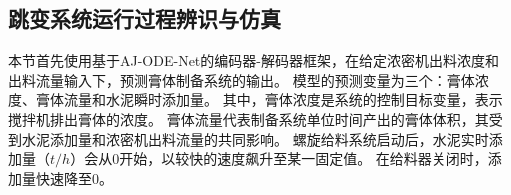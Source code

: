 \subsection{跳变系统运行过程辨识与仿真}
\label{sec:case-study1}
本节首先使用基于AJ-ODE-Net的编码器-解码器框架，在给定浓密机出料浓度和出料流量输入下，预测膏体制备系统的输出。
模型的预测变量为三个：膏体浓度、膏体流量和水泥瞬时添加量。
其中，膏体浓度是系统的控制目标变量，表示搅拌机排出膏体的浓度。
膏体流量代表制备系统单位时间产出的膏体体积，其受到水泥添加量和浓密机出料流量的共同影响。
螺旋给料系统启动后，水泥实时添加量（$t/h$）会从0开始，以较快的速度飙升至某一固定值。
在给料器关闭时，添加量快速降至0。

